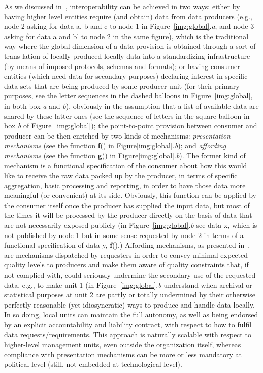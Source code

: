 \documentclass{article}
\begin{document}
As we discussed in~\citep{cabitza_whatever_2012}, interoperability can be achieved in two ways: either by having higher level entities require (and obtain) data from data producers (e.g., node 2 asking for data a, b and c to node 1 in Figure~\ref{img:global}.\textit{a}, and node 3 asking for data a and b' to node 2 in the same figure), which is the traditional way where the global dimension of a data provision is obtained through a sort of trans-lation of locally produced locally data into a standardizing infrastructure (by means of imposed protocols, schemas and formats); or having consumer entities (which need data for secondary purposes) declaring interest in specific data sets that are being produced by some producer unit (for their primary purposes, see the letter sequences in the dashed balloons in Figure~\ref{img:global}, in both box \textit{a} and \textit{b}), obviously in the assumption that a list of available data are shared by these latter ones (see the sequence of letters in the square balloon in box \textit{b} of Figure~\ref{img:global}); the point-to-point provision between consumer and producer can be then enriched by two kinds of mechanisms: \emph{presentation mechanisms} (see the function \textbf{f}() in Figure\ref{img:global}.\textit{b}); and \emph{affording mechanisms} (see the function \textbf{g}() in Figure\ref{img:global}.\textit{b}). The former kind of mechanism is a functional specification of the consumer about how this would like to receive the raw data packed up by the producer, in terms of specific aggregation, basic processing and reporting, in order to have those data more meaningful (or convenient) at its side. Obviously, this function can be applied by the consumer itself once the producer has supplied the input data, but most of the times it will be processed by the producer directly on the basis of data that are not necessarily exposed publicly (in Figure~\ref{img:global}.\textit{b} see data x, which is not published by node 1 but in some sense requested by node 2 in terms of a functional specification of data y, \textbf{f}().)
Affording mechanisms, as presented in~\citep{cabitza_whatever_2012}, are mechanisms dispatched by requesters in order to convey minimal expected quality levels to producers and make them aware of quality constraints that, if not complied with, could seriously undermine the secondary use of the requested data, e.g., to make unit 1 (in Figure~\ref{img:global}.\textit{b} understand when archival or statistical purposes at unit 2 are partly or totally undermined by their otherwise perfectly reasonable (yet idiosyncratic) ways to produce and handle data locally. In so doing, local units can maintain the full autonomy, as well as being endorsed by an explicit accountability and liability contract, with respect to how to fulfil data requests/requirements. This approach is naturally scalable with respect to higher-level management units, even outside the organization itself, whereas compliance with presentation mechanisms can be more or less mandatory at political level (still, not embedded at technological level).
\end{document}
